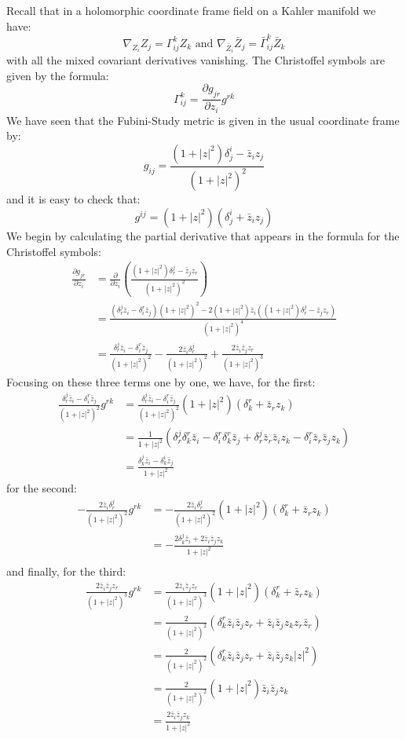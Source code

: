 \documentclass[11pt]{amsart}
\theoremstyle{definition}
\def \del{ \partial }
\begin{document}
Recall that in a holomorphic coordinate frame field on a Kahler manifold we have:
%
$$\nabla_{ Z_i }{ Z_j }= \Gamma^k_{ij} Z_k \text{ and } \nabla_{ \bar{Z}_i }{ \bar{Z}_j } = \bar{ \Gamma }^k_{ij} \bar{Z}_k $$
%
with all the mixed covariant derivatives vanishing.  The Christoffel symbols are given by the formula:
%
$$ \Gamma^k_{ij} = \frac{ \del g_{jr} }{\del z_i} g^{rk} $$
%
We have seen that the Fubini-Study metric is given in the usual coordinate frame by:
%
$$ g_{ij} = \frac{ (1 + |z|^2)\delta^i_j - \bar{z}_i z_j }{ (1 + |z|^2)^2 } $$
%
and it is easy to check that:
%
$$g^{ij} = (1 + |z|^2)( \delta^i_j + \bar{z}_i z_j )$$
%
We begin by calculating the partial derivative that appears in the formula for the Christoffel symbols:
%
\begin{align*}
\frac{ \del g_{jr} }{\del z_i} &= \frac{\del}{ \del z_i }\left( \frac{ (1 + |z|^2) \delta^j_r - \bar{z}_j z_r }{ (1 + |z|^2)^2 } \right) \\
&= \frac{ ( \delta^j_r \bar{z}_i - \delta^r_i \bar{z}_j ) (1 + |z|^2 )^2 - 2 (1 + |z|^2 ) \bar{z}_i( (1 + |z|^2)\delta^j_r - \bar{z}_j z_r )}{ (1 + |z|^2 )^4 } \\
&= \frac{ \delta^j_r \bar{z}_i - \delta^r_i \bar{z}_j }{ (1 + |z|^2)^2 } - \frac{ 2 \bar{z}_i \delta^j_r }{ (1 + |z|^2)^2 } + \frac{ 2 \bar{z}_i \bar{z}_j z_r }{ (1 + |z|^2)^3 }
\end{align*}
%
Focusing on these three terms one by one, we have, for the first:
%
\begin{align*}
\frac{ \delta^j_r \bar{z}_i - \delta^r_i \bar{z}_j }{ (1 + |z|^2)^2 } g^{rk} &= \frac{ \delta^j_r \bar{z}_i - \delta^r_i \bar{z}_j }{ (1 + |z|^2)^2 } (1 + |z|^2)( \delta^r_k + \bar{z}_r z_k ) \\
&= \frac{1}{ 1 + |z|^2 } ( \delta^j_r \delta^r_k \bar{z}_i - \delta^r_i \delta^r_k \bar{z}_j + \delta^j_r \bar{z}_r \bar{z}_i z_k - \delta^r_i \bar{z}_r \bar{z}_j z_k ) \\
&= \frac{ \delta^j_k \bar{z}_i - \delta^i_k \bar{z}_j }{ 1 + |z|^2 }
\end{align*}
%
for the second:
%
\begin{align*}
- \frac{ 2 \bar{z}_i \delta^j_r }{ (1 + |z|^2)^2 }g^{rk} &= - \frac{ 2 \bar{z}_i \delta^j_r }{ (1 + |z|^2)^2 }(1 + |z|^2)( \delta^r_k + \bar{z}_r z_k ) \\
&= - \frac{2 \delta^j_k \bar{z}_i + 2 \bar{z}_i \bar{z}_j z_k}{1 + |z|^2}\\
\end{align*}
%
and finally, for the third:
%
\begin{align*}
\frac{ 2 \bar{z}_i \bar{z}_j z_r }{ (1 + |z|^2)^3 } g^{rk} &= \frac{ 2 \bar{z}_i \bar{z}_j z_r }{ (1 + |z|^2)^3 } (1 + |z|^2)( \delta^r_k + \bar{z}_r z_k ) \\
&= \frac{2}{(1 + |z|^2)^2}( \delta^r_k \bar{z}_i \bar{z}_j z_r + \bar{z}_i \bar{z}_j z_k z_r \bar{z}_r ) \\
&= \frac{2}{(1 + |z|^2)^2}( \delta^r_k \bar{z}_i \bar{z}_j z_r + \bar{z}_i \bar{z}_j z_k |z|^2 ) \\
&= \frac{2}{(1 + |z|^2)^2}(1 + |z|^2)\bar{z}_i \bar{z}_j z_k  \\
&= \frac{2 \bar{z}_i \bar{z}_j z_k }{1 + |z|^2}
\end{align*}
\end{document}
